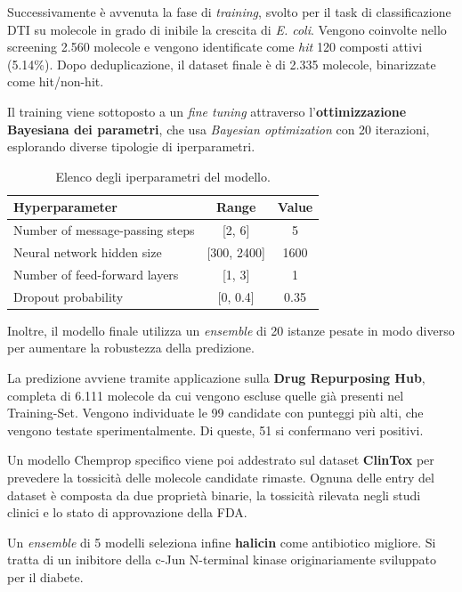Successivamente è avvenuta la fase di \textit{training}, svolto per il task di classificazione DTI su molecole in grado di inibile la crescita di \textit{E. coli}. Vengono coinvolte nello screening 2.560 molecole e vengono identificate come \textit{hit} 120 composti attivi (5.14\%).
Dopo deduplicazione, il dataset finale è di 2.335 molecole, binarizzate come hit/non-hit.

Il training viene sottoposto a un \textit{fine tuning} attraverso l'\textbf{ottimizzazione Bayesiana dei parametri}, che usa \textit{Bayesian optimization} con 20 iterazioni, esplorando diverse tipologie di iperparametri.

\begin{table}[ht]
    \centering
    \caption{Elenco degli iperparametri del modello.}
    \label{tab:iperparametri}
    \begin{tabular}{lcc}
        \toprule
        \textbf{Hyperparameter} & \textbf{Range} & \textbf{Value} \\
        \midrule
        Number of message-passing steps & [2, 6] & 5 \\
        Neural network hidden size      & [300, 2400] & 1600 \\
        Number of feed-forward layers   & [1, 3] & 1 \\
        Dropout probability             & [0, 0.4] & 0.35 \\
        \bottomrule
    \end{tabular}
\end{table}

Inoltre, il modello finale utilizza un \textit{ensemble} di 20 istanze pesate in modo diverso per aumentare la robustezza della predizione.

La predizione avviene tramite applicazione sulla \textbf{Drug Repurposing Hub}, completa di 6.111 molecole da cui vengono escluse quelle già presenti nel Training-Set.
Vengono individuate le 99 candidate con punteggi più alti, che vengono testate sperimentalmente. Di queste, 51 si confermano veri positivi.

Un modello Chemprop specifico viene poi addestrato sul dataset \textbf{ClinTox} per prevedere la tossicità delle molecole candidate rimaste.
Ognuna delle entry del dataset è composta da due proprietà binarie, la tossicità rilevata negli studi clinici e lo stato di approvazione della FDA.

Un \textit{ensemble} di 5 modelli seleziona infine \textbf{halicin} come antibiotico migliore. Si tratta di un inibitore della c-Jun N-terminal kinase originariamente sviluppato per il diabete.

